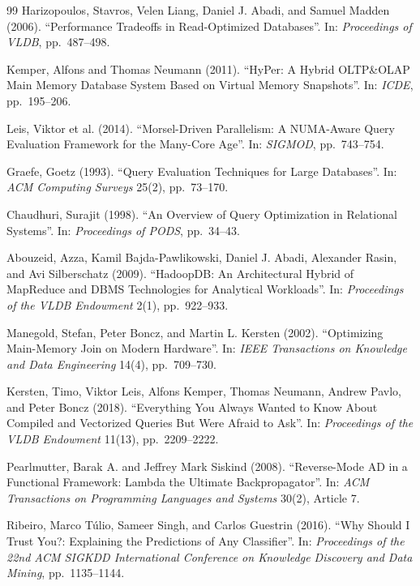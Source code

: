 \documentclass[12pt]{report}
\begin{document}
\begin{thebibliography}{99}
Harizopoulos, Stavros, Velen Liang,
Daniel J. Abadi, and Samuel Madden (2006).
``Performance Tradeoffs in Read-Optimized Databases''.
In: \textit{Proceedings of VLDB},
pp.~487--498.

Kemper, Alfons and Thomas Neumann (2011).
``HyPer: A Hybrid OLTP\&OLAP Main Memory Database System Based on Virtual Memory Snapshots''.
In: \textit{ICDE},
pp.~195--206.

Leis, Viktor et al. (2014).
``Morsel-Driven Parallelism: A NUMA-Aware Query Evaluation Framework for the Many-Core Age''.
In: \textit{SIGMOD},
pp.~743--754.

Graefe, Goetz (1993).
``Query Evaluation Techniques for Large Databases''.
In: \textit{ACM Computing Surveys} 25(2),
pp.~73--170.

Chaudhuri, Surajit (1998).
``An Overview of Query Optimization in Relational Systems''.
In: \textit{Proceedings of PODS},
pp.~34--43.

Abouzeid, Azza, Kamil Bajda-Pawlikowski,
Daniel J. Abadi, Alexander Rasin,
and Avi Silberschatz (2009).
``HadoopDB: An Architectural Hybrid of MapReduce and DBMS Technologies for Analytical Workloads''.
In: \textit{Proceedings of the VLDB Endowment} 2(1),
pp.~922--933.

Manegold, Stefan, Peter Boncz,
and Martin L. Kersten (2002).
``Optimizing Main-Memory Join on Modern Hardware''.
In: \textit{IEEE Transactions on Knowledge and Data Engineering} 14(4),
pp.~709--730.

Kersten, Timo, Viktor Leis,
Alfons Kemper, Thomas Neumann,
Andrew Pavlo, and Peter Boncz (2018).
``Everything You Always Wanted to Know About Compiled and Vectorized Queries But Were Afraid to Ask''.
In: \textit{Proceedings of the VLDB Endowment} 11(13),
pp.~2209--2222.

Pearlmutter, Barak A. and Jeffrey Mark Siskind (2008).
``Reverse-Mode AD in a Functional Framework: Lambda the Ultimate Backpropagator''.
In: \textit{ACM Transactions on Programming Languages and Systems} 30(2),
Article 7.

Ribeiro, Marco T\'ulio, Sameer Singh,
and Carlos Guestrin (2016).
``Why Should I Trust You?: Explaining the Predictions of Any Classifier''.
In: \textit{Proceedings of the 22nd ACM SIGKDD International Conference on Knowledge Discovery and Data Mining},
pp.~1135--1144.


\end{thebibliography}
\end{document}
